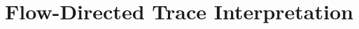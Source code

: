 \documentclass[conference]{IEEEtran}
\begin{document}
%






\section{Flow-Directed Trace Interpretation}



\end{document}
